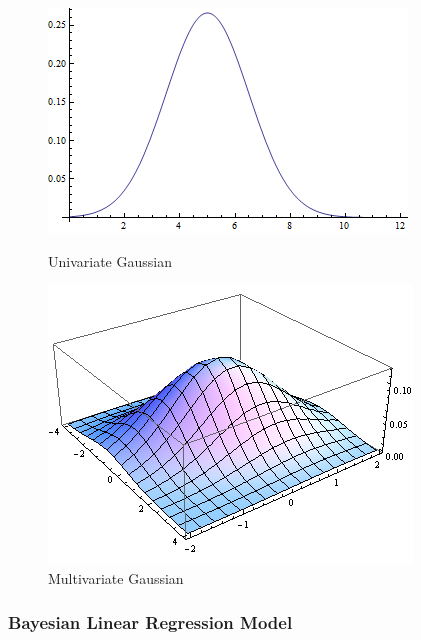\documentclass[english]{tktltiki}
\begin{document}
\begin{figure}
\centering
\begin{minipage}{.5\linewidth}
  \centering
  \includegraphics[width=\linewidth]{gp_1d.png}
  \caption{Univariate Gaussian}
  \label{fig:gaussian_1d}
\end{minipage}%
\begin{minipage}{.41\linewidth}
  \centering
  \includegraphics[width=\linewidth]{gp_2d.png}
  \caption{Multivariate Gaussian}
  \label{fig:gaussian_2d}
\end{minipage}

\label{fig:test}
\end{figure}


\subsubsection{Bayesian Linear Regression Model}
\end{document}
